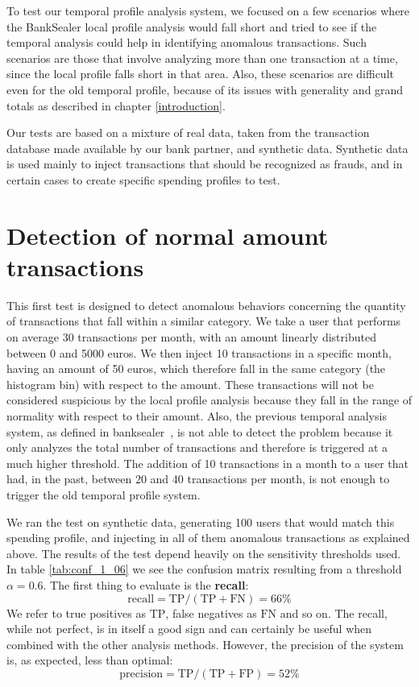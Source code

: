

To test our temporal profile analysis system, we focused on a few scenarios where the BankSealer local profile analysis would fall short and tried to see if the temporal analysis could help in identifying anomalous transactions. Such scenarios are those that involve analyzing more than one transaction at a time, since the local profile falls short in that area. Also, these scenarios are difficult even for the old temporal profile, because of its issues with generality and grand totals as described in chapter \ref{introduction}.

Our tests are based on a mixture of real data, taken from the transaction database made available by our bank partner, and synthetic data. Synthetic data is used mainly to inject transactions that should be recognized as frauds, and in certain cases to create specific spending profiles to test.

\section{Detection of normal amount transactions}

This first test is designed to detect anomalous behaviors concerning the quantity of transactions that fall within a similar category. We take a user that performs on average 30 transactions per month, with an amount linearly distributed between 0 and 5000 euros. We then inject 10 transactions in a specific month, having an amount of 50 euros, which therefore fall in the same category (the histogram bin) with respect to the amount. These transactions will not be considered suspicious by the local profile analysis because they fall in the range of normality with respect to their amount. Also, the previous temporal analysis system, as defined in banksealer~\cite{banksealer}, is not able to detect the problem because it only analyzes the total number of transactions and therefore is triggered at a much higher threshold. The addition of 10 transactions in a month to a user that had, in the past, between 20 and 40 transactions per month, is not enough to trigger the old temporal profile system.

We ran the test on synthetic data, generating 100 users that would match this spending profile, and injecting in all of them anomalous transactions as explained above. The results of the test depend heavily on the sensitivity thresholds used. In table \ref{tab:conf_1_06} we see the confusion matrix resulting from a threshold $\alpha = 0.6$. The first thing to evaluate is the \textbf{recall}:
\begin{displaymath}
\text{recall} = \text{TP} / (\text{TP} + \text{FN}) = 66\%
\end{displaymath}
We refer to true positives as $\text{TP}$, false negatives as $\text{FN}$ and so on.
The recall, while not perfect, is in itself a good sign and can certainly be useful when combined with the other analysis methods. However, the precision of the system is, as expected, less than optimal:
\begin{displaymath}
\text{precision} = \text{TP} / (\text{TP} + \text{FP}) = 52\%
\end{displaymath}

